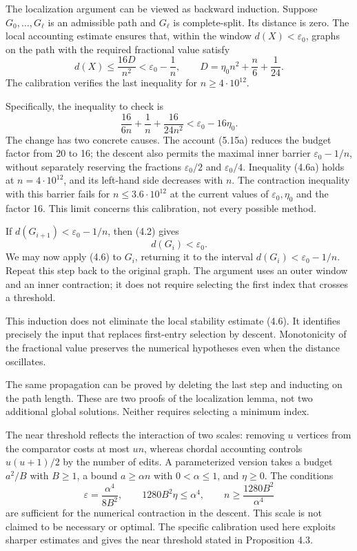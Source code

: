 \documentclass[english,11pt,a4paper]{article}
\begin{document}
The localization argument can be viewed as backward induction. Suppose \(G_0,\ldots,G_\ell\) is an admissible path and \(G_\ell\) is complete-split. Its distance is zero. The local accounting estimate ensures that, within the window \(d(X)<\varepsilon_0\), graphs on the path with the required fractional value satisfy \[
d(X)\le\frac{16D}{n^2}<\varepsilon_0-\frac1n,\qquad
D=\eta_0n^2+\frac n6+\frac1{24}.
\tag{4.6}
\] The calibration verifies the last inequality for \(n\ge4\cdot10^{12}\).

Specifically, the inequality to check is \[
\frac{16}{6n}+\frac1n+\frac{16}{24n^2}
<\varepsilon_0-16\eta_0.
\tag{4.6a}
\] The change has two concrete causes. The account (5.15a) reduces the budget factor from 20 to 16; the descent also permits the maximal inner barrier \(\varepsilon_0-1/n\), without separately reserving the fractions \(\varepsilon_0/2\) and \(\varepsilon_0/4\). Inequality (4.6a) holds at \(n=4\cdot10^{12}\), and its left-hand side decreases with \(n\). The contraction inequality with this barrier fails for \(n\le3.6\cdot10^{12}\) at the current values of \(\varepsilon_0,\eta_0\) and the factor 16. This limit concerns this calibration, not every possible method.

If \(d(G_{i+1})<\varepsilon_0-1/n\), then (4.2) gives \[
d(G_i)<\varepsilon_0.
\] We may now apply (4.6) to \(G_i\), returning it to the interval \(d(G_i)<\varepsilon_0-1/n\). Repeat this step back to the original graph. The argument uses an outer window and an inner contraction; it does not require selecting the first index that crosses a threshold.

This induction does not eliminate the local stability estimate (4.6). It identifies precisely the input that replaces first-entry selection by descent. Monotonicity of the fractional value preserves the numerical hypotheses even when the distance oscillates.

The same propagation can be proved by deleting the last step and inducting on the path length. These are two proofs of the localization lemma, not two additional global solutions. Neither requires selecting a minimum index.

The near threshold reflects the interaction of two scales: removing \(u\) vertices from the comparator costs at most \(un\), whereas chordal accounting controls \(u(u+1)/2\) by the number of edits. A parameterized version takes a budget \(a^2/B\) with \(B\ge1\), a bound \(a\ge\alpha n\) with \(0<\alpha\le1\), and \(\eta\ge0\). The conditions \[
\varepsilon=\frac{\alpha^4}{8B^2},\qquad
1280B^2\eta\le\alpha^4,\qquad
n\ge\frac{1280B^2}{\alpha^4}
\] are sufficient for the numerical contraction in the descent. This scale is not claimed to be necessary or optimal. The specific calibration used here exploits sharper estimates and gives the near threshold stated in Proposition 4.3.
\end{document}

